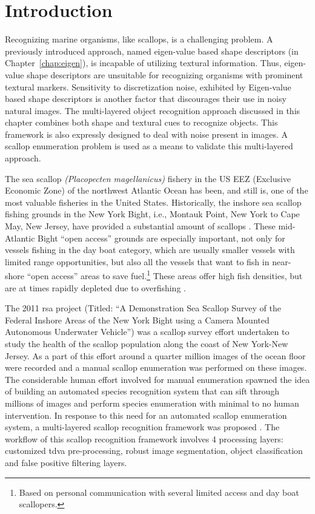 \documentclass {udthesis}
\begin{document}
\section{Introduction}

Recognizing marine organisms, like scallops, is a challenging problem. A previously introduced approach, named eigen-value based shape descriptors (in Chapter~\ref{chap:eigen}), is incapable of utilizing textural information. Thus, eigen-value shape descriptors are unsuitable for recognizing organisms with prominent textural markers. Sensitivity to discretization noise, exhibited by Eigen-value based shape descriptors is another factor that discourages their use in noisy natural images. The multi-layered object recognition approach discussed in this chapter combines both shape and textural cues to recognize objects. This framework is also expressly designed to deal with noise present in images. A scallop enumeration problem is used as a means to validate this multi-layered approach.

The sea scallop \textit{(Placopecten magellanicus)} fishery in the 
US EEZ (Exclusive Economic Zone) of the northwest Atlantic Ocean has been, and still is, one of 
the most valuable fisheries in the United States. 
Historically, the inshore sea scallop fishing grounds in the New York Bight, 
i.e., Montauk Point, New York to Cape May, New Jersey, have provided 
a substantial amount of scallops \cite{caddy, serchuk, hart, naidu, fisheries}.
These mid-Atlantic Bight ``open access'' 
grounds are especially important, not only for vessels fishing in the day boat 
category, which are usually smaller vessels with limited range opportunities, 
but also all the vessels that want to fish in near-shore ``open access'' 
areas to save fuel.\footnote{Based on personal communication with several limited 
access and day boat scallopers.} 
These areas offer high fish densities, but are at times rapidly depleted due 
to overfishing \cite{rosenberg}.      

The 2011 \gls{rsa} 
project (Titled: ``A Demonstration Sea Scallop Survey of the 
Federal Inshore Areas of the New York Bight using a Camera Mounted Autonomous Underwater
Vehicle'') was a scallop survey effort undertaken to study the health of the scallop population
along the coast of New York-New Jersey. As a part of this effort around a quarter million images of the 
ocean floor were recorded and a manual scallop enumeration was performed on these images.
The considerable human effort involved for manual enumeration spawned the idea of building an automated species
recognition system that can sift through millions of images and perform species enumeration with minimal to no human intervention.
In response to this need for an automated scallop enumeration system, a multi-layered scallop
recognition framework was proposed \cite{prasanna_med, prasanna_aslo, prasanna_igi}.
The workflow of this scallop recognition framework involves 4 processing layers:
customized \gls{tdva} pre-processing, robust image 
segmentation, object classification and false positive filtering layers. 
\end{document}
